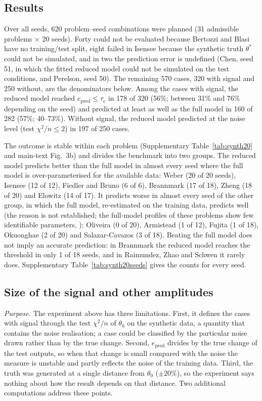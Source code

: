 \subsection*{Results}
Over all seeds, 620 problem--seed combinations were planned (31 admissible problems $\times$ 20 seeds). Forty could not be evaluated because Bertozzi and Blasi have no training/test split, eight failed in Isensee because the synthetic truth $\theta^\ast$ could not be simulated, and in two the prediction error is undefined (Chen, seed 51, in which the fitted reduced model could not be simulated on the test conditions, and Perelson, seed 50). The remaining 570 cases, 320 with signal and 250 without, are the denominators below. Among the cases with signal, the reduced model reached $e_{\mathrm{pred}}\le\tau_e$ in 178 of 320 (56\%; between 31\% and 76\% depending on the seed) and predicted at least as well as the full model in 160 of 282 (57\%; 40--73\%). Without signal, the reduced model predicted at the noise level (test $\chi^2/n\le2$) in 197 of 250 cases.

The outcome is stable within each problem (Supplementary Table~\ref{tab:synth20} and main-text Fig.~3b) and divides the benchmark into two groups. The reduced model predicts better than the full model in almost every seed where the full model is over-parameterised for the available data: Weber (20 of 20 seeds), Isensee (12 of 12), Fiedler and Bruno (6 of 6), Brannmark (17 of 18), Zheng (18 of 20) and Elowitz (14 of 17). It predicts worse in almost every seed of the other group, in which the full model, re-estimated on the training data, predicts well (the reason is not established; the full-model profiles of these problems show few identifiable parameters, ): Oliveira (0 of 20), Armistead (1 of 12), Fujita (1 of 18), Okuonghae (2 of 20) and Salazar-Cavazos (3 of 18). Beating the full model does not imply an accurate prediction: in Brannmark the reduced model reaches the threshold in only 1 of 18 seeds, and in Raimundez, Zhao and Schwen it rarely does. Supplementary Table~\ref{tab:synth20seeds} gives the counts for every seed.

{\small

}

{\small

}

\subsection*{Size of the signal and other amplitudes}
\emph{Purpose.} The experiment above has three limitations. First, it defines the cases with signal through the test $\chi^2/n$ of $\theta_0$ on the synthetic data, a quantity that contains the noise realisation; a case could be classified by the particular noise drawn rather than by the true change. Second, $e_{\mathrm{pred}}$ divides by the true change of the test outputs, so when that change is small compared with the noise the measure is unstable and partly reflects the noise of the training data. Third, the truth was generated at a single distance from $\theta_0$ ($\pm20\%$), so the experiment says nothing about how the result depends on that distance. Two additional computations address these points.

